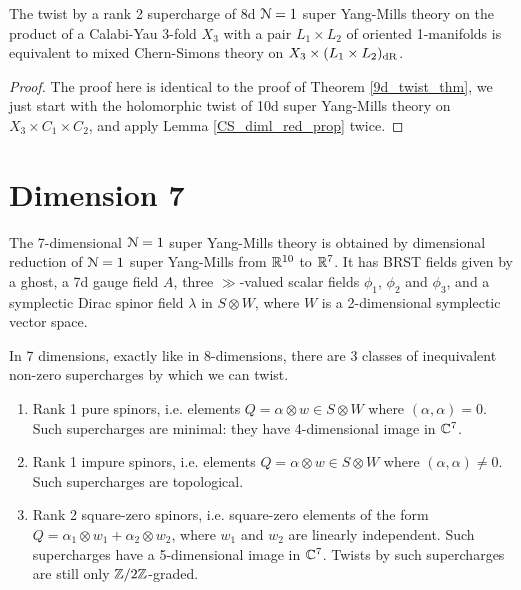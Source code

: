 \documentclass[10pt, oneside]{article}
\begin{document}
\begin{theorem} \label{8d_rank2_twist_thm}
The twist by a rank 2 supercharge of 8d $\mathcal{N}=1$ super Yang-Mills theory on the product of a Calabi-Yau 3-fold $X_3$ with a pair $L_1 \times L_2$ of oriented 1-manifolds is equivalent to mixed Chern-Simons theory on $X_3 \times (L_1 \times L_2)_{\mathrm{dR}}$.
\end{theorem}

\begin{proof}
The proof here is identical to the proof of Theorem \ref{9d_twist_thm}, we just start with the holomorphic twist of 10d super Yang-Mills theory on $X_3 \times C_1 \times C_2$, and apply Lemma \ref{CS_diml_red_prop} twice.
\end{proof}



\section{Dimension 7} \label{7d_section}
The 7-dimensional $\mathcal{N}=1$ super Yang-Mills theory is obtained by dimensional reduction of $\mathcal{N}=1$ super Yang-Mills from $\mathbb R^{10}$ to $\mathbb R^7$.  It has BRST fields given by a ghost, a 7d gauge field $A$, three $\gg$-valued scalar fields $\phi_1$, $\phi_2$ and $\phi_3$, and a symplectic Dirac spinor field $\lambda$ in $S \otimes W$, where $W$ is a 2-dimensional symplectic vector space.

In 7 dimensions, exactly like in 8-dimensions, there are 3 classes of inequivalent non-zero supercharges by which we can twist.
\begin{enumerate}
 \item Rank 1 pure spinors, i.e. elements $Q = \alpha \otimes w \in S \otimes W$ where $(\alpha, \alpha)=0$.  Such supercharges are minimal: they have 4-dimensional image in $\mathbb C^7$.
 \item Rank 1 impure spinors, i.e. elements $Q = \alpha \otimes w \in S \otimes W$ where $(\alpha, \alpha)\ne 0$.  Such supercharges are topological.
 \item Rank 2 square-zero spinors, i.e. square-zero elements of the form $Q = \alpha_1 \otimes w_1 + \alpha_2 \otimes w_2$, where $w_1$ and $w_2$ are linearly independent.  Such supercharges have a 5-dimensional image in $\mathbb C^7$.  Twists by such supercharges are still only $\mathbb Z/2\mathbb Z$-graded. 
\end{enumerate}
\end{document}
